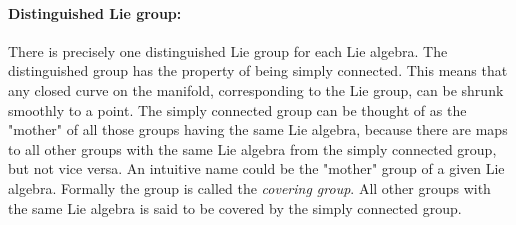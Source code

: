 \paragraph{Distinguished Lie group:} There is precisely one distinguished Lie group for each Lie algebra. The distinguished group has the property of being simply connected. This means that any closed curve on the manifold, corresponding to the Lie group, can be shrunk smoothly to a point. The simply connected group can be thought of as the "mother" of all those groups having the same Lie algebra, because there are maps to all other groups with the same Lie algebra from the simply connected group, but not vice versa. An intuitive name could be the "mother" group of a given Lie algebra. Formally the group is called the \emph{covering group}. All other groups with the same Lie algebra is said to be covered by the simply connected group.

